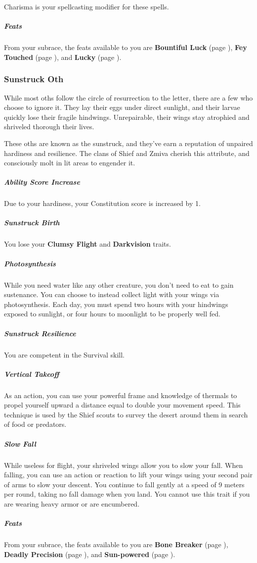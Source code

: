     Charisma is your spellcasting modifier for these spells.

    \subparagraph{Feats} From your subrace, the feats available to you are
    \textbf{Bountiful Luck} (page \pageref{feat::bountifulluck}),
    \textbf{Fey Touched} (page \pageref{feat::feytouched}), and
    \textbf{Lucky} (page \pageref{feat::lucky}).

\subsubsection{Sunstruck Oth}
    While most oths follow the circle of resurrection to the letter, there are a few who choose to ignore it.
    They lay their eggs under direct sunlight, and their larvae quickly lose their fragile hindwings.
    Unrepairable, their wings stay atrophied and shriveled thorough their lives.

    These oths are known as the sunstruck, and they've earn a reputation of unpaired hardiness and resilience.
    The clans of Shief and Zmiva cherish this attribute, and consciously molt in lit areas to engender it.

    \subparagraph{Ability Score Increase} Due to your hardiness, your Constitution score is increased by 1.

    \subparagraph{Sunstruck Birth} You lose your \textbf{Clumsy Flight} and \textbf{Darkvision} traits.

    \subparagraph{Photosynthesis} While you need water like any other creature, you don't need to eat to gain sustenance.
    You can choose to instead collect light with your wings via photosynthesis.
    Each day, you must spend two hours with your hindwings exposed to sunlight, or four hours to moonlight to be properly well fed.

    \subparagraph{Sunstruck Resilience} You are competent in the Survival skill.

    \subparagraph{Vertical Takeoff} As an action, you can use your powerful frame and knowledge of thermals to propel yourself upward a distance equal to double your movement speed.
    This technique is used by the Shief scouts to survey the desert around them in search of food or predators.

    \subparagraph{Slow Fall} While useless for flight, your shriveled wings allow you to slow your fall.
    When falling, you can use an action or reaction to lift your wings using your second pair of arms to slow your descent.
    You continue to fall gently at a speed of 9 meters per round, taking no fall damage when you land.
    You cannot use this trait if you are wearing heavy armor or are encumbered.

    \subparagraph{Feats} From your subrace, the feats available to you are
    \textbf{Bone Breaker} (page \pageref{feat::bonebreaker}),
    \textbf{Deadly Precision} (page \pageref{feat::deadlyprecision}), and
    \textbf{Sun-powered} (page \pageref{feat::sunpowered}).

\newpage
